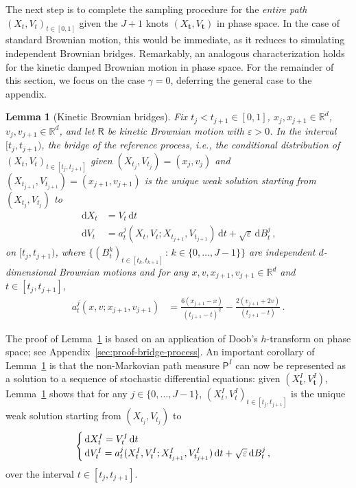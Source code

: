 \documentclass[12pt]{article}
\theoremstyle{plain}
\theoremstyle{plain}
\newtheorem{lem}{Lemma}
\theoremstyle{remark}
\newcommand{\R}{\mathbb{R}}
\newcommand{\dd}{\,\mathrm{d}}
\newcommand{\msf}[1]{\mathsf{#1}}
\newcommand{\eps}{\varepsilon}
\newcommand{\rset}{\mathbb{R}}
\def\rset{\mathbb{R}}
\newcommand{\ccint}[1]{\left[#1\right]}
\newcommand{\1}{\bm{1}}
\theoremstyle{plain}
\theoremstyle{definition}
\theoremstyle{remark}
\begin{document}
The next step is to complete the sampling procedure for the \emph{entire path} $(X_t, V_t)_{t\in[0,1]}$ given the $J+1$ knots $(X_{\bm t}, V_{\bm t})$ in phase space. In the case of standard Brownian motion, this would be immediate, as it reduces to simulating independent Brownian bridges. Remarkably, an analogous characterization holds for the kinetic damped Brownian motion in phase space. For the remainder of this section, we focus on the case $\gamma = 0$, deferring the general case to the appendix.
\begin{lem}[Kinetic Brownian bridges]\label{lem:bridge_process}
Fix $t_j < t_{j+1} \in [0,1]$, $x_j,x_{j+1} \in \R^d$, $v_{j}, v_{j+1} \in \R^d$, and let $\msf R$ be kinetic Brownian motion with $\eps > 0$. {In the interval $[t_j,t_{j+1})$, the bridge of the reference process, i.e., the conditional distribution of $(X_t,V_t)_{t\in\ccint{t_j,t_{j+1}}}$ given  $(X_{t_{j}},V_{t_{j}}) = (x_j, v_j)$ and $(X_{t_{j+1}},V_{t_{j+1}}) = (x_{j+1}, v_{j+1})$} is the unique weak solution starting from $(X_{t_j},V_{t_j})$ to
\begin{align}\label{eq:bridge_proc}
        \dd X_t& = V_t\dd t \\
        \dd V_t &= a^j_t(X_t,V_t; X_{t_{j+1}},V_{t_{j+1}})\dd t + \sqrt{\varepsilon} \dd{ B_t^j}\,,
\end{align}
on $[t_j,t_{j+1})$, { where $\{(B_t^{k})_{t \in\ccint{t_k,t_{k+1}}} \, :\, k \in \{0,\ldots,J-1\}\}$ are independent $d$-dimensional Brownian motions}
and  for any $x,v,x_{j+1},v_{j+1} \in\rset^d$ and $t \in\ccint{t_j,t_{j+1}}$,
\begin{align}\label{eq:a_jt}
        a_t^{j}(x,v;x_{j+1},v_{j+1}) &=
    \frac{6(x_{j+1} - x)}{(t_{j+1}-t)^2} - \frac{2(v_{j+1} + 2v)}{(t_{j+1}-t)}\,.
\end{align}
\end{lem}
The proof of Lemma~\ref{lem:bridge_process} is based on an application of Doob's $h$-transform on phase space; see Appendix~\ref{sec:proof-bridge-process}. An important corollary of Lemma~\ref{lem:bridge_process} is that the non-Markovian path measure $\msf P^I$ can now be represented as a solution to a sequence of stochastic differential equations: given $(X_{\bm t}^I, V_{\bm t}^I)$, Lemma~\ref{lem:bridge_process} shows that for any  $j\in\{0,\ldots,J-1\}$, $(X^I_{t},V_t^I)_{t\in[t_j,t_{j+1}]}$ is the unique weak solution starting from $(X_{t_j},V_{t_j})$ to
\begin{align}\label{conditional_acceleration_SDE}
\begin{cases}
\dd X^I_t = V^I_t \dd t\\
\dd V^I_t = a_t^j(X^I_t,V^I_t ;X^I_{t_{j+1}},V^I_{t_{j+1}})\dd t + \sqrt{\eps}\dd B_t^j\,,
\end{cases}\raisetag{1.5\baselineskip}
\end{align}
over the interval $t\in[t_j,t_{j+1}]$.
\end{document}
